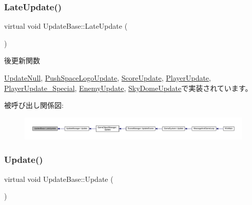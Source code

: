 \subsubsection{\texorpdfstring{Late\+Update()}{LateUpdate()}}
{\footnotesize\ttfamily virtual void Update\+Base\+::\+Late\+Update (\begin{DoxyParamCaption}{ }\end{DoxyParamCaption})\hspace{0.3cm}{\ttfamily [pure virtual]}}



後更新関数 



\mbox{\hyperlink{class_update_null_ac68da1ba7f3fbcae833442bb1c169200}{Update\+Null}}, \mbox{\hyperlink{class_push_space_logo_update_a4423864fb22b1211e92a4317d0b70a44}{Push\+Space\+Logo\+Update}}, \mbox{\hyperlink{class_score_update_adc9a48f54828e49c072c298777935893}{Score\+Update}}, \mbox{\hyperlink{class_player_update_ae376f517f3458edfef61ac366aa78e36}{Player\+Update}}, \mbox{\hyperlink{class_player_update___special_a1daae8fdcd87bf907313a98e022f254c}{Player\+Update\+\_\+\+Special}}, \mbox{\hyperlink{class_enemy_update_ae14e4ebb42ad9043534e53edcba5b242}{Enemy\+Update}}, \mbox{\hyperlink{class_sky_dome_update_a94347cb50b4dc13528738a7b812da261}{Sky\+Dome\+Update}}で実装されています。

被呼び出し関係図\+:
\nopagebreak
\begin{figure}[H]
\begin{center}
\leavevmode
\includegraphics[width=350pt]{class_update_base_afc4956f78135aed5fc4e4f9991be50b9_icgraph}
\end{center}
\end{figure}
\mbox{\label{class_update_base_a9fdc8924001cf6fa89c1f5fa0d867682}} 
\subsubsection{\texorpdfstring{Update()}{Update()}}
{\footnotesize\ttfamily virtual void Update\+Base\+::\+Update (\begin{DoxyParamCaption}{ }\end{DoxyParamCaption})\hspace{0.3cm}{\ttfamily [pure virtual]}}



